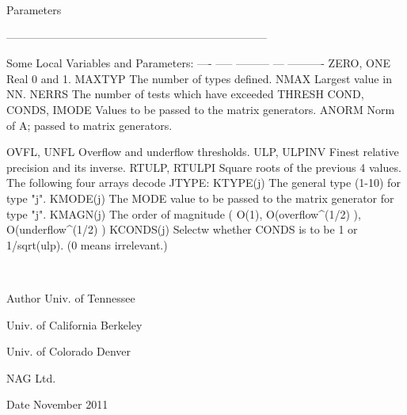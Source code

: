 \begin{DoxyParams}[1]{Parameters}
\begin{DoxyVerb}
-----------------------------------------------------------------------

     Some Local Variables and Parameters:
     ---- ----- --------- --- ----------
     ZERO, ONE       Real 0 and 1.
     MAXTYP          The number of types defined.
     NMAX            Largest value in NN.
     NERRS           The number of tests which have exceeded THRESH
     COND, CONDS,
     IMODE           Values to be passed to the matrix generators.
     ANORM           Norm of A; passed to matrix generators.

     OVFL, UNFL      Overflow and underflow thresholds.
     ULP, ULPINV     Finest relative precision and its inverse.
     RTULP, RTULPI   Square roots of the previous 4 values.
             The following four arrays decode JTYPE:
     KTYPE(j)        The general type (1-10) for type "j".
     KMODE(j)        The MODE value to be passed to the matrix
                     generator for type "j".
     KMAGN(j)        The order of magnitude ( O(1),
                     O(overflow^(1/2) ), O(underflow^(1/2) )
     KCONDS(j)       Selectw whether CONDS is to be 1 or
                     1/sqrt(ulp).  (0 means irrelevant.)\end{DoxyVerb}
 \\
\hline
\end{DoxyParams}
\begin{DoxyAuthor}{Author}
Univ. of Tennessee 

Univ. of California Berkeley 

Univ. of Colorado Denver 

N\+A\+G Ltd. 
\end{DoxyAuthor}
\begin{DoxyDate}{Date}
November 2011 
\end{DoxyDate}
\hypertarget{group__double__eig_ga4db8108d75a2a49d865e766418fa0726}{}
